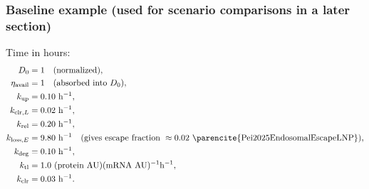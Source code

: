 \subsubsection*{Baseline example (used for scenario comparisons in a later section)}

Time in hours:
\begin{align*}
D_0 &= 1 \quad \text{(normalized)}, \\
\eta_{\mathrm{avail}} &= 1 \quad \text{(absorbed into $D_0$)}, \\
k_{\mathrm{up}} &= 0.10\ \mathrm{h}^{-1}, \\
k_{\mathrm{clr},L} &= 0.02\ \mathrm{h}^{-1}, \\
k_{\mathrm{rel}} &= 0.20\ \mathrm{h}^{-1}, \\
k_{\mathrm{loss},E} &= 9.80\ \mathrm{h}^{-1} \quad (\text{gives escape fraction } \approx 0.02 \ \text{\parencite{Pei2025EndosomalEscapeLNP}}), \\
k_{\mathrm{deg}} &= 0.10\ \mathrm{h}^{-1}, \\
k_{\mathrm{tl}} &= 1.0\ (\text{protein AU})(\text{mRNA AU})^{-1}\mathrm{h}^{-1}, \\
k_{\mathrm{clr}} &= 0.03\ \mathrm{h}^{-1}.
\end{align*}
